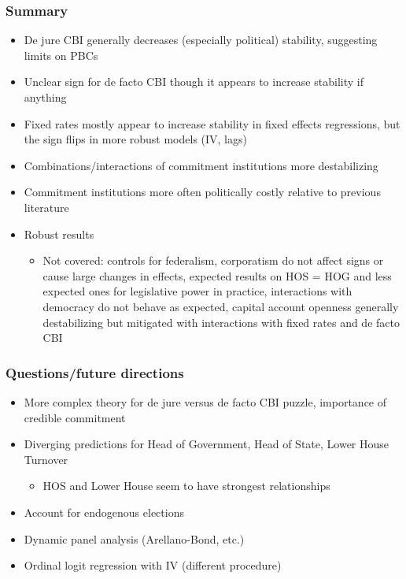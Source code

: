 \documentclass{beamer}
\begin{document}
    \begin{frame}
        \frametitle{Summary}
        \begin{itemize}
            \item De jure CBI generally decreases (especially political) stability, suggesting limits on PBCs
            \item Unclear sign for de facto CBI though it appears to increase stability if anything
            \item Fixed rates mostly appear to increase stability in fixed effects regressions, but the sign flips in more robust models (IV, lags)
            \item Combinations/interactions of commitment institutions more destabilizing
            \item Commitment institutions more often politically costly relative to previous literature
            \item Robust results
            \begin{itemize}
                \item Not covered: controls for federalism, corporatism do not affect signs or cause large changes in effects, expected results on HOS = HOG and less expected ones for legislative power in practice, interactions with democracy do not behave as expected, capital account openness generally destabilizing but mitigated with interactions with fixed rates and de facto CBI
            \end{itemize}
        \end{itemize}
    \end{frame}

    \begin{frame}
        \frametitle{Questions/future directions}
        \begin{itemize}
            \item More complex theory for de jure versus de facto CBI puzzle, importance of credible commitment
            \item Diverging predictions for Head of Government, Head of State, Lower House Turnover
            \begin{itemize}
                \item HOS and Lower House seem to have strongest relationships
            \end{itemize}
            \item Account for endogenous elections
            \item Dynamic panel analysis (Arellano-Bond, etc.)
            \item Ordinal logit regression with IV (different procedure)
        \end{itemize}
    \end{frame}
\end{document}
